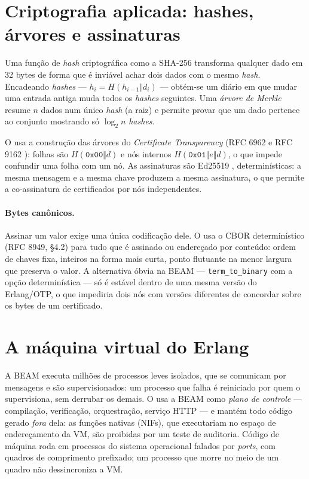 \section{Criptografia aplicada: hashes, árvores e assinaturas}\label{sec:cripto}

\begin{graduacao}
Uma função de \textit{hash} criptográfica como a SHA-256 transforma qualquer dado em 32 bytes de forma que é inviável achar dois dados com o mesmo \textit{hash}. Encadeando \textit{hashes} --- $h_i = H(h_{i-1} \Vert d_i)$ --- obtém-se um diário em que mudar uma entrada antiga muda todos os \textit{hashes} seguintes. Uma \emph{árvore de Merkle} \cite{merkle1987} resume $n$ dados num único \textit{hash} (a raiz) e permite provar que um dado pertence ao conjunto mostrando só $\log_2 n$ \textit{hashes}.
\end{graduacao}

O \vapor{} usa a construção das árvores do \textit{Certificate Transparency} (RFC 6962 e RFC 9162 \cite{rfc6962,rfc9162}): folhas são $H(\texttt{0x00} \Vert d)$ e nós internos $H(\texttt{0x01} \Vert e \Vert d)$, o que impede confundir uma folha com um nó. As assinaturas são Ed25519 \cite{bernstein2012}, determinísticas: a mesma mensagem e a mesma chave produzem a mesma assinatura, o que permite a co-assinatura de certificados por nós independentes.

\paragraph{Bytes canônicos.} Assinar um valor exige uma única codificação dele. O \vapor{} usa o CBOR determinístico (RFC 8949, §4.2) para tudo que é assinado ou endereçado por conteúdo: ordem de chaves fixa, inteiros na forma mais curta, ponto flutuante na menor largura que preserva o valor. A alternativa óbvia na BEAM --- \texttt{term\_to\_binary} com a opção determinística --- só é estável dentro de uma mesma versão do Erlang/OTP, o que impediria dois nós com versões diferentes de concordar sobre os bytes de um certificado.

\section{A máquina virtual do Erlang}\label{sec:beam}

A BEAM \cite{armstrong2003} executa milhões de processos leves isolados, que se comunicam por mensagens e são supervisionados: um processo que falha é reiniciado por quem o supervisiona, sem derrubar os demais. O \vapor{} usa a BEAM como \emph{plano de controle} --- compilação, verificação, orquestração, serviço HTTP --- e mantém todo código gerado \emph{fora} dela: as funções nativas (NIFs), que executariam no espaço de endereçamento da VM, são proibidas por um teste de auditoria. Código de máquina roda em processos do sistema operacional falados por \textit{ports}, com quadros de comprimento prefixado; um processo que morre no meio de um quadro não dessincroniza a VM.

